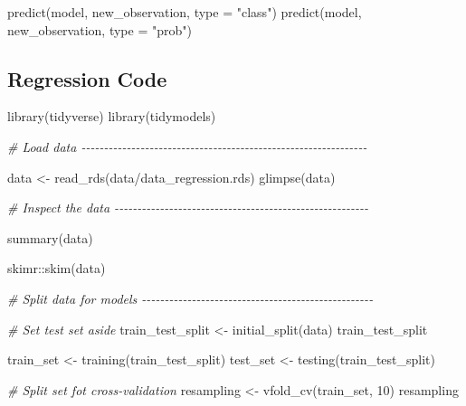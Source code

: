 \documentclass[
]{book}
\newenvironment{Shaded}{\begin{snugshade}}{\end{snugshade}}
\newcommand{\AttributeTok}[1]{\textcolor[rgb]{0.77,0.63,0.00}{#1}}
\newcommand{\CommentTok}[1]{\textcolor[rgb]{0.56,0.35,0.01}{\textit{#1}}}
\newcommand{\DecValTok}[1]{\textcolor[rgb]{0.00,0.00,0.81}{#1}}
\newcommand{\FunctionTok}[1]{\textcolor[rgb]{0.00,0.00,0.00}{#1}}
\newcommand{\NormalTok}[1]{#1}
\newcommand{\OtherTok}[1]{\textcolor[rgb]{0.56,0.35,0.01}{#1}}
\newcommand{\SpecialCharTok}[1]{\textcolor[rgb]{0.00,0.00,0.00}{#1}}
\newcommand{\StringTok}[1]{\textcolor[rgb]{0.31,0.60,0.02}{#1}}
\begin{document}
\begin{Shaded}
\begin{Highlighting}[]
\FunctionTok{predict}\NormalTok{(model, new\_observation, }\AttributeTok{type =} \StringTok{"class"}\NormalTok{)}
\FunctionTok{predict}\NormalTok{(model, new\_observation, }\AttributeTok{type =} \StringTok{"prob"}\NormalTok{)}
\end{Highlighting}
\end{Shaded}

\hypertarget{regression-code}{%
\subsection{Regression Code}\label{regression-code}}

\begin{Shaded}
\begin{Highlighting}[]
\FunctionTok{library}\NormalTok{(tidyverse)}
\FunctionTok{library}\NormalTok{(tidymodels)}


\CommentTok{\# Load data {-}{-}{-}{-}{-}{-}{-}{-}{-}{-}{-}{-}{-}{-}{-}{-}{-}{-}{-}{-}{-}{-}{-}{-}{-}{-}{-}{-}{-}{-}{-}{-}{-}{-}{-}{-}{-}{-}{-}{-}{-}{-}{-}{-}{-}{-}{-}{-}{-}{-}{-}{-}{-}{-}{-}{-}{-}{-}{-}{-}{-}{-}{-}}

\NormalTok{data }\OtherTok{\textless{}{-}} \FunctionTok{read\_rds}\NormalTok{(}\StringTok{\textquotesingle{}data/data\_regression.rds\textquotesingle{}}\NormalTok{)}
\FunctionTok{glimpse}\NormalTok{(data)}

\CommentTok{\# Inspect the data {-}{-}{-}{-}{-}{-}{-}{-}{-}{-}{-}{-}{-}{-}{-}{-}{-}{-}{-}{-}{-}{-}{-}{-}{-}{-}{-}{-}{-}{-}{-}{-}{-}{-}{-}{-}{-}{-}{-}{-}{-}{-}{-}{-}{-}{-}{-}{-}{-}{-}{-}{-}{-}{-}{-}{-}}

\FunctionTok{summary}\NormalTok{(data)}

\NormalTok{skimr}\SpecialCharTok{::}\FunctionTok{skim}\NormalTok{(data)}

\CommentTok{\# Split data for models {-}{-}{-}{-}{-}{-}{-}{-}{-}{-}{-}{-}{-}{-}{-}{-}{-}{-}{-}{-}{-}{-}{-}{-}{-}{-}{-}{-}{-}{-}{-}{-}{-}{-}{-}{-}{-}{-}{-}{-}{-}{-}{-}{-}{-}{-}{-}{-}{-}{-}{-}}

\CommentTok{\# Set test set aside}
\NormalTok{train\_test\_split }\OtherTok{\textless{}{-}} \FunctionTok{initial\_split}\NormalTok{(data)}
\NormalTok{train\_test\_split}

\NormalTok{train\_set }\OtherTok{\textless{}{-}} \FunctionTok{training}\NormalTok{(train\_test\_split)}
\NormalTok{test\_set }\OtherTok{\textless{}{-}} \FunctionTok{testing}\NormalTok{(train\_test\_split)}

\CommentTok{\# Split set fot cross{-}validation}
\NormalTok{resampling }\OtherTok{\textless{}{-}} \FunctionTok{vfold\_cv}\NormalTok{(train\_set, }\DecValTok{10}\NormalTok{)}
\NormalTok{resampling}



\end{Highlighting}
\end{Shaded}
\end{document}
